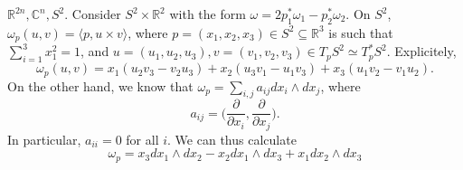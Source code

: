 \documentclass[misc]{subfiles}
\begin{document}
\begin{Exp}
    $\mathbb{R}^{2n}, \mathbb{C}^n, S^2$. Consider $S^2\times \mathbb{R}^2$ with the form $\omega = 2p_1^\ast\omega_1 - p_2^\ast\omega_2$. On $S^2$, $\omega_p(u,v) = \langle p, u\times v \rangle$, where $p=(x_1,x_2,x_3)\in S^2\subseteq \mathbb{R}^3$ is such that $\sum_{i=1}^3 x_1^2 = 1$, and $u=(u_1,u_2,u_3),v=(v_1,v_2,v_3)\in T_pS^2\simeq T_p^\ast S^2$. Explicitely,
    \[
    \omega_p(u,v) = x_1(u_2v_3 - v_2u_3) + x_2(u_3v_1 - u_1v_3) + x_3(u_1v_2 - v_1u_2).
    \] 
    On the other hand, we know that $\omega_p = \sum_{i,j} a_{ij} dx_i\wedge dx_j$, where
    \[
    a_{ij} = \bigg( \frac{\partial}{\partial x_i}, \frac{\partial}{\partial x_j}\bigg).
    \] 
    In particular, $a_{ii}=0$ for all $i$. We can thus calculate
    \[
    \omega_p = x_3dx_1\wedge dx_2 - x_2dx_1\wedge dx_3 + x_1dx_2\wedge dx_3 
    \] 
\end{Exp}

\end{document}
